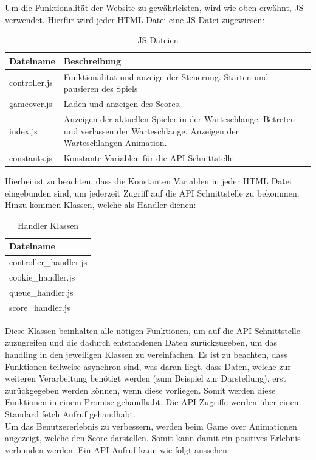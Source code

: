 \documentclass[a4paper,12pt]{scrartcl}
\begin{document}
Um die Funktionalität der Website zu gewährleisten, wird wie oben erwähnt, JS verwendet. Hierfür wird jeder HTML Datei eine JS Datei zugewiesen:


\begin{table}[!htb]
\centering
\begin{tabular}{p{4cm}|p{4cm}|p{8cm}}
Dateiname & Beschreibung \\
\hline
controller.js & Funktionalität und anzeige der Steuerung. Starten und pausieren des Spiels \\
gameover.js & Laden und anzeigen des Scores. \\
index.js & Anzeigen der aktuellen Spieler in der Warteschlange. Betreten und verlassen der Warteschlange. Anzeigen der Warteschlangen Animation. \\
constants.js & Konstante Variablen für die API Schnittstelle. \\
\end{tabular}
\caption{JS Dateien}
\end{table}

Hierbei ist zu beachten, dass die Konstanten Variablen in jeder HTML Datei eingebunden sind, um jederzeit Zugriff auf die API Schnittstelle zu bekommen. Hinzu kommen Klassen, welche als Handler dienen:

\newpage
\begin{table}[!htb]
\centering
\begin{tabular}{p{4cm}}
Dateiname \\
\hline
controller\_handler.js \\
cookie\_handler.js \\
queue\_handler.js \\
score\_handler.js \\
\end{tabular}
\caption{Handler Klassen}
\end{table}

Diese Klassen beinhalten alle nötigen Funktionen, um auf die API Schnittstelle zuzugreifen und die dadurch entstandenen Daten zurückzugeben, um das handling in den jeweiligen Klassen zu vereinfachen. Es ist zu beachten, dass Funktionen teilweise asynchron sind, was daran liegt, dass Daten, welche zur weiteren Verarbeitung benötigt werden (zum Beispiel zur Darstellung), erst zurückgegeben werden können, wenn diese vorliegen. Somit werden diese Funktionen in einem Promise gehandhabt. Die API Zugriffe werden über einen Standard fetch Aufruf gehandhabt. \\
Um das Benutzererlebnis zu verbessern, werden beim Game over Animationen angezeigt, welche den Score darstellen. Somit kann damit ein positives Erlebnis verbunden werden. Ein API Aufruf kann wie folgt aussehen:
\end{document}
